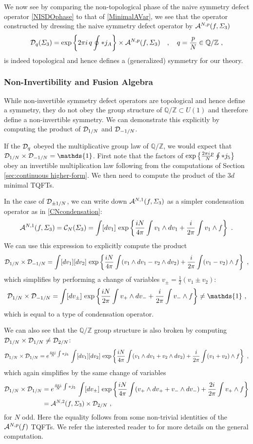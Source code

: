 \documentclass[11pt]{article}
\newcommand{\eq}[1]{\begin{align}\begin{split}#1\end{split}\end{align}}
\def\half{\frac{1}{2}}
\def\CA{{\cal A}}
\def\CC {{\cal C}}
\def\CD {{\cal D}}
\def\IQ{\mathbb{Q}}
\def\IZ{{\mathbb{Z}}}
\begin{document}
We now see by comparing the non-topological phase of the naive symmetry defect operator \eqref{NISDOphase} to that of \eqref{MinimalAVar}, we see that the operator constructed by dressing the naive symmetry defect operator by $\CA^{N,p}(f,\Sigma_3)$
\eq{
\CD_q(\Sigma_3)={\rm exp}\left\{2\pi i\, q \oint \ast j_A\right\}\times \CA^{N,p}(f,\Sigma_3)\quad, \quad q=\frac{p}{N}\in \IQ/\IZ~,
}
is indeed topological and hence defines a (generalized) symmetry for our theory. 

 


\subsubsection{Non-Invertibility and Fusion Algebra}

While non-invertible symmetry defect operators are topological and hence define a symmetry, they do not obey the group structure of $\IQ/\IZ\subset U(1)$ and therefore define a non-invertible symmetry. We can demonstrate this explicitly by computing the product of $\CD_{1/N}$ and $\CD_{-1/N}$. 

If the $\CD_q$ obeyed the multiplicative group law of $\IQ/\IZ$, we would expect that $\CD_{1/N}\times \CD_{-1/N}=\mathds{1}$. 
First note that the factors of ${\rm exp}\left\{ \frac{2\pi i\,p}{N} \oint\ast j_5\right\}$ obey an invertible multiplication law following from the computations of Section \ref{sec:continuous higher-form}. We then need to compute the product of the $3d$ minimal TQFTs. 

In the case of $\CD_{\pm 1/N}$, we can write down $\CA^{N,1}(f,\Sigma_3)$ as a simpler condensation operator as in \eqref{CNcondensation}:
\eq{
\CA^{N,1}(f,\Sigma_3)=
\CC_N(\Sigma_3)=\int [dv_1]~{\rm exp}\left\{
\frac{iN}{4\pi}\int v_1\wedge dv_1+\frac{i}{2\pi}\int v_1\wedge f
\right\}~.
}
 We can use this expression to  explicitly compute the product 
 \eq{
\CD_{1/N}\times \CD_{-1/N}=\int [dv_1][dv_2]~{\rm exp}\left\{
\frac{iN}{4\pi}\int (v_1\wedge dv_1-v_2\wedge dv_2)+\frac{i}{2\pi}\int (v_1-v_2)\wedge f
\right\}~,
}
which simplifies by performing a change of variables $v_\pm=\half(v_1\pm v_2)$:
\eq{\label{onlycomputableCD}
\CD_{1/N}\times \CD_{-1/N}=\int [dv_\pm]~{\rm exp}\left\{
\frac{iN}{2\pi}\int v_+\wedge dv_-+\frac{i}{2\pi}\int v_-\wedge f
\right\}\neq \mathds{1}~,
}
which is equal to a type of condensation operator. 

We can also see that the $\IQ/\IZ$ group structure is also broken by computing $\CD_{1/N}\times \CD_{1/N}\neq \CD_{2/N}$:
\eq{
\CD_{1/N}\times \CD_{1/N}= e^{\frac{4\pi i}{N}\int \ast j_5}\, \int [dv_1][dv_2]~{\rm exp}\left\{
\frac{iN}{4\pi}\int (v_1\wedge dv_1+v_2\wedge dv_2)+\frac{i}{2\pi}\int (v_1+v_2)\wedge f
\right\}~,
}
which again simplifies by the same change of variables
\eq{
\CD_{1/N}\times \CD_{1/N}&=e^{\frac{4\pi i}{N}\int \ast j_5}\,\int [dv_\pm]~{\rm exp}\left\{
\frac{iN}{4\pi}\int (v_+\wedge dv_++v_-\wedge dv_-)+\frac{2i}{2\pi}\int v_+\wedge f
\right\}\\
&=\CA^{N,2}(f,\Sigma_3)\times \CD_{2/N}~,
}
for $N$ odd. Here the equality follows from some non-trivial identities of the $\CA^{N,p}(f)$ TQFTs. We refer the interested reader to \cite{Hsin:2018vcg} for more details on the general computation. 
\end{document}
